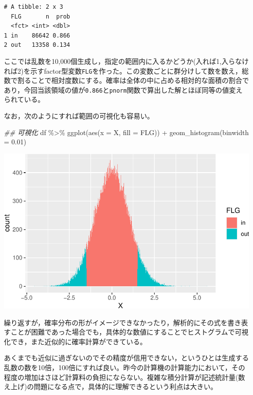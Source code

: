 \documentclass[
  a4paper,
]{ltjsbook}
\newenvironment{Shaded}{\begin{snugshade}}{\end{snugshade}}
\newcommand{\AttributeTok}[1]{\textcolor[rgb]{0.40,0.45,0.13}{#1}}
\newcommand{\DocumentationTok}[1]{\textcolor[rgb]{0.37,0.37,0.37}{\textit{#1}}}
\newcommand{\FloatTok}[1]{\textcolor[rgb]{0.68,0.00,0.00}{#1}}
\newcommand{\FunctionTok}[1]{\textcolor[rgb]{0.28,0.35,0.67}{#1}}
\newcommand{\NormalTok}[1]{\textcolor[rgb]{0.00,0.23,0.31}{#1}}
\newcommand{\SpecialCharTok}[1]{\textcolor[rgb]{0.37,0.37,0.37}{#1}}
\begin{document}
\begin{verbatim}
# A tibble: 2 x 3
  FLG       n  prob
  <fct> <int> <dbl>
1 in    86642 0.866
2 out   13358 0.134
\end{verbatim}

ここでは乱数を10,000個生成し，指定の範囲内に入るかどうか(入れば1,入らなければ2)を示すfactor型変数\texttt{FLG}を作った。この変数ごとに群分けして数を数え，総数で割ることで相対度数にする。確率は全体の中に占める相対的な面積の割合であり，今回当該領域の値が\texttt{0.866}と\texttt{pnorm}関数で算出した解とほぼ同等の値変えられている。

なお，次のようにすれば範囲の可視化も容易い。

\begin{Shaded}
\begin{Highlighting}[]
\DocumentationTok{\#\# 可視化}
\NormalTok{df }\SpecialCharTok{\%\textgreater{}\%}
  \FunctionTok{ggplot}\NormalTok{(}\FunctionTok{aes}\NormalTok{(}\AttributeTok{x =}\NormalTok{ X, }\AttributeTok{fill =}\NormalTok{ FLG)) }\SpecialCharTok{+}
  \FunctionTok{geom\_histogram}\NormalTok{(}\AttributeTok{binwidth =} \FloatTok{0.01}\NormalTok{)}
\end{Highlighting}
\end{Shaded}

\includegraphics{chapter06_files/figure-pdf/norm_vis-1.pdf}

繰り返すが，確率分布の形がイメージできなかったり，解析的にその式を書き表すことが困難であった場合でも，具体的な数値にすることでヒストグラムで可視化でき，また近似的に確率計算ができている。

あくまでも近似に過ぎないのでその精度が信用できない，というひとは生成する乱数の数を10倍，100倍にすれば良い。昨今の計算機の計算能力において，その程度の増加はさほど計算料の負担にならない。複雑な積分計算が記述統計量(数え上げ)の問題になる点で，具体的に理解できるという利点は大きい。
\end{document}
